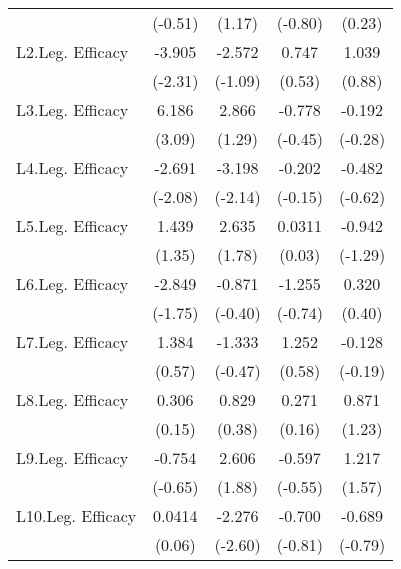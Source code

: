 {\begin{longtable}{l*{4}{c}}
                &  (-0.51)         &   (1.17)         &  (-0.80)         &   (0.23)         \\
[1em]
L2.Leg. Efficacy&   -3.905\sym{*}  &   -2.572         &    0.747         &    1.039         \\
                &  (-2.31)         &  (-1.09)         &   (0.53)         &   (0.88)         \\
[1em]
L3.Leg. Efficacy&    6.186\sym{**} &    2.866         &   -0.778         &   -0.192         \\
                &   (3.09)         &   (1.29)         &  (-0.45)         &  (-0.28)         \\
[1em]
L4.Leg. Efficacy&   -2.691\sym{*}  &   -3.198\sym{*}  &   -0.202         &   -0.482         \\
                &  (-2.08)         &  (-2.14)         &  (-0.15)         &  (-0.62)         \\
[1em]
L5.Leg. Efficacy&    1.439         &    2.635         &   0.0311         &   -0.942         \\
                &   (1.35)         &   (1.78)         &   (0.03)         &  (-1.29)         \\
[1em]
L6.Leg. Efficacy&   -2.849         &   -0.871         &   -1.255         &    0.320         \\
                &  (-1.75)         &  (-0.40)         &  (-0.74)         &   (0.40)         \\
[1em]
L7.Leg. Efficacy&    1.384         &   -1.333         &    1.252         &   -0.128         \\
                &   (0.57)         &  (-0.47)         &   (0.58)         &  (-0.19)         \\
[1em]
L8.Leg. Efficacy&    0.306         &    0.829         &    0.271         &    0.871         \\
                &   (0.15)         &   (0.38)         &   (0.16)         &   (1.23)         \\
[1em]
L9.Leg. Efficacy&   -0.754         &    2.606         &   -0.597         &    1.217         \\
                &  (-0.65)         &   (1.88)         &  (-0.55)         &   (1.57)         \\
[1em]
L10.Leg. Efficacy&   0.0414         &   -2.276\sym{**} &   -0.700         &   -0.689         \\
                &   (0.06)         &  (-2.60)         &  (-0.81)         &  (-0.79)         \\

\end{longtable}}
